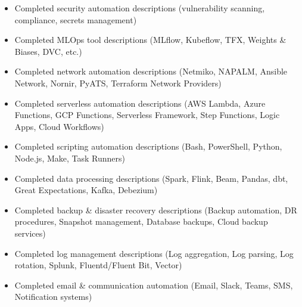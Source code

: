 \documentclass[11pt,a4paper]{article}
\begin{document}
\begin{itemize}
\item Completed security automation descriptions (vulnerability scanning, compliance, secrets management)
\end{itemize}

\begin{itemize}
\item Completed MLOps tool descriptions (MLflow, Kubeflow, TFX, Weights & Biases, DVC, etc.)
\end{itemize}

\begin{itemize}
\item Completed network automation descriptions (Netmiko, NAPALM, Ansible Network, Nornir, PyATS, Terraform Network Providers)
\end{itemize}

\begin{itemize}
\item Completed serverless automation descriptions (AWS Lambda, Azure Functions, GCP Functions, Serverless Framework, Step Functions, Logic Apps, Cloud Workflows)
\end{itemize}

\begin{itemize}
\item Completed scripting automation descriptions (Bash, PowerShell, Python, Node.js, Make, Task Runners)
\end{itemize}

\begin{itemize}
\item Completed data processing descriptions (Spark, Flink, Beam, Pandas, dbt, Great Expectations, Kafka, Debezium)
\end{itemize}

\begin{itemize}
\item Completed backup & disaster recovery descriptions (Backup automation, DR procedures, Snapshot management, Database backups, Cloud backup services)
\end{itemize}

\begin{itemize}
\item Completed log management descriptions (Log aggregation, Log parsing, Log rotation, Splunk, Fluentd/Fluent Bit, Vector)
\end{itemize}

\begin{itemize}
\item Completed email & communication automation (Email, Slack, Teams, SMS, Notification systems)
\end{itemize}
\end{document}
